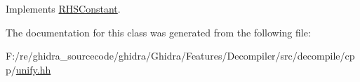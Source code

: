 Implements \mbox{\hyperlink{class_r_h_s_constant_a79e03c6da5320e24873a4fee25f91411}{R\+H\+S\+Constant}}.



The documentation for this class was generated from the following file\+:\begin{DoxyCompactItemize}
\item 
F\+:/re/ghidra\+\_\+sourcecode/ghidra/\+Ghidra/\+Features/\+Decompiler/src/decompile/cpp/\mbox{\hyperlink{unify_8hh}{unify.\+hh}}\end{DoxyCompactItemize}
